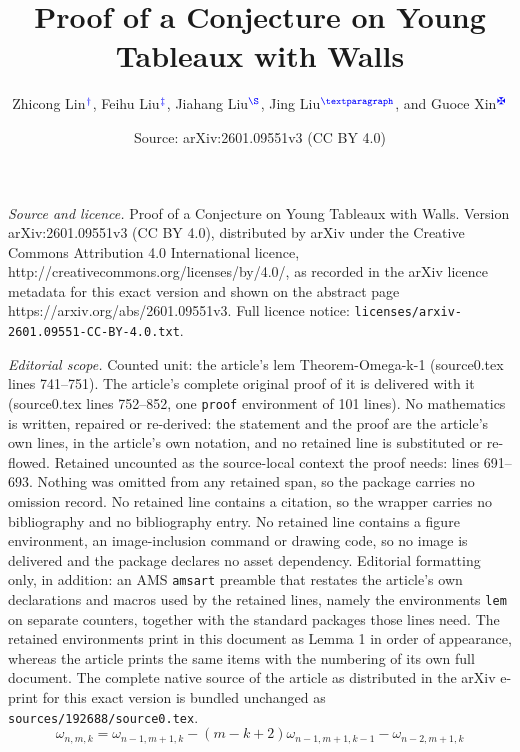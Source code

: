 \documentclass[10pt,a4paper]{amsart}
\title{Proof of a Conjecture on Young Tableaux with Walls}
\author{Zhicong Lin$^{\color{blue} \dag}$, Feihu Liu$^{\color{blue} \ddag}$, Jiahang Liu$^{\color{blue} \S}$, Jing Liu$^{\color{blue}\P}$, and Guoce Xin$^{\color{blue} \maltese}$}
\date{Source: arXiv:2601.09551v3 (CC BY 4.0)}
\begin{document}
\maketitle

\noindent\emph{Source and licence.} Proof of a Conjecture on Young Tableaux with Walls. Version arXiv:2601.09551v3 (CC BY 4.0), distributed by arXiv under the Creative Commons Attribution 4.0 International licence, http://creativecommons.org/licenses/by/4.0/, as recorded in the arXiv licence metadata for this exact version and shown on the abstract page https://arxiv.org/abs/2601.09551v3. Full licence notice: \texttt{licenses/arxiv-2601.09551-CC-BY-4.0.txt}.\par\smallskip

\noindent\textit{Editorial scope.} Counted unit: the article's lem Theorem-Omega-k-1 (source0.tex lines 741--751). The article's complete original proof of it is delivered with it (source0.tex lines 752--852, one \texttt{proof} environment of 101 lines). No mathematics is written, repaired or re-derived: the statement and the proof are the article's own lines, in the article's own notation, and no retained line is substituted or re-flowed.  Retained uncounted as the source-local context the proof needs: lines 691--693.  Nothing was omitted from any retained span, so the package carries no omission record.  No retained line contains a citation, so the wrapper carries no bibliography and no bibliography entry.  No retained line contains a figure environment, an image-inclusion command or drawing code, so no image is delivered and the package declares no asset dependency.  Editorial formatting only, in addition: an AMS \texttt{amsart} preamble that restates the article's own declarations and macros used by the retained lines, namely the environments \texttt{lem} on separate counters, together with the standard packages those lines need.  The retained environments print in this document as Lemma 1 in order of appearance, whereas the article prints the same items with the numbering of its own full document.  The complete native source of the article as distributed in the arXiv e-print for this exact version is bundled unchanged as \texttt{sources/192688/source0.tex}.
\begin{equation}\label{rec:omega}
\omega_{n,m,k}=\omega_{n-1,m+1,k}-(m-k+2)\omega_{n-1,m+1,k-1}-\omega_{n-2,m+1,k}
\end{equation}
\end{document}
